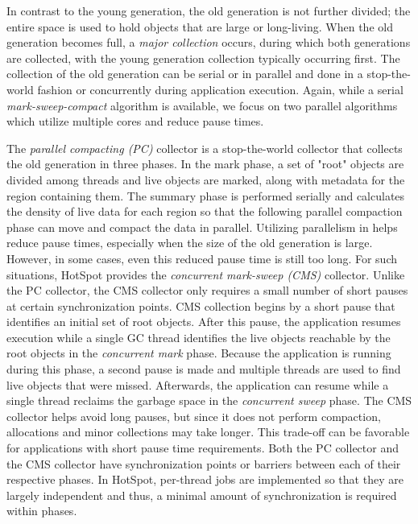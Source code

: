 \documentclass{sig-alternate}
\begin{document}
In contrast to the young generation, the old generation is not further divided; the entire space is used to hold objects that are large or long-living. When the old generation becomes full, a \textit{major collection} occurs, during which both generations are collected, with the young generation collection typically occurring first. The collection of the old generation can be serial or in parallel and done in a stop-the-world fashion or concurrently during application execution. Again, while a serial \textit{mark-sweep-compact} algorithm is available, we focus on two parallel algorithms which utilize multiple cores and reduce pause times.

The \textit{parallel compacting (PC)} collector is a stop-the-world collector that collects the old generation in three phases. In the mark phase, a set of "root" objects are divided among threads and live objects are marked, along with metadata for the region containing them. The summary phase is performed serially and calculates the density of live data for each region so that the following parallel compaction phase can move and compact the data in parallel. Utilizing parallelism in helps reduce pause times, especially when the size of the old generation is large. However, in some cases, even this reduced pause time is still too long. For such situations, HotSpot provides the \textit{concurrent mark-sweep (CMS)} collector. Unlike the PC collector, the CMS collector only requires a small number of short pauses at certain synchronization points. CMS collection begins by a short pause that identifies an initial set of root objects. After this pause, the application resumes execution while a single GC thread identifies the live objects reachable by the root objects in the \textit{concurrent mark} phase. Because the application is running during this phase, a second pause is made and multiple threads are used to find live objects that were missed. Afterwards, the application can resume while a single thread reclaims the garbage space in the \textit{concurrent sweep} phase. The CMS collector helps avoid long pauses, but since it does not perform compaction, allocations and minor collections may take longer. This trade-off can be favorable for applications with short pause time requirements. Both the PC collector and the CMS collector have synchronization points or barriers between each of their respective phases. In HotSpot, per-thread jobs are implemented so that they are largely independent and thus, a minimal amount of synchronization is required within phases.
\end{document}
